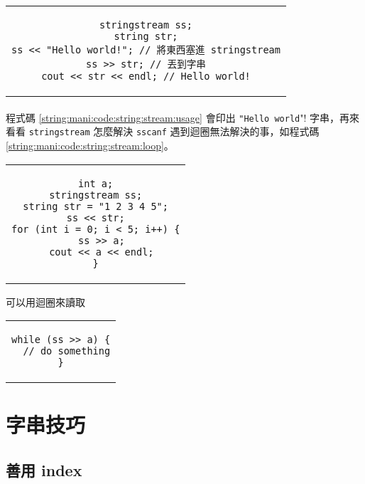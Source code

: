 \documentclass[12pt,a4paper,oneside]{report}
\begin{document}
\begin{CJK}{UTF8}{bkai}
\begin{code}[h!]
  \centering
  \begin{tabular}{c}
  \begin{lstlisting}
stringstream ss;
string str;
ss << "Hello world!"; // 將東西塞進 stringstream
ss >> str; // 丟到字串
cout << str << endl; // Hello world!
  \end{lstlisting}
  \end{tabular}
  \caption{\lstinline!stringstream! 基本用法}
  \label{string:mani:code:string:stream:usage}
\end{code}

\paragraph{}程式碼 \ref{string:mani:code:string:stream:usage} 會印出 \lstinline!"Hello world!"! 字串，再來看看 \lstinline!stringstream! 怎麼解決 \lstinline!sscanf! 遇到迴圈無法解決的事，如程式碼 \ref{string:mani:code:string:stream:loop}。

\begin{code}[h!]
  \centering
  \begin{tabular}{c}
  \begin{lstlisting}
int a;
stringstream ss;
string str = "1 2 3 4 5";
ss << str;
for (int i = 0; i < 5; i++) {
  ss >> a;
  cout << a << endl;
}
  \end{lstlisting}
  \end{tabular}
  \caption{可以用迴圈來讀取}
  \label{string:mani:code:string:stream:loop}
\end{code}

\begin{code}[h!]
  \centering
  \begin{tabular}{c}
  \begin{lstlisting}
while (ss >> a) {
  // do something
}
  \end{lstlisting}
  \end{tabular}
  \caption{\lstinline!stringstream! 碰到 EOF}
  \label{string:mani:code:string:stream:eof}
\end{code}

\section{字串技巧}

\subsection{善用 index}


\end{CJK}
\end{document}
